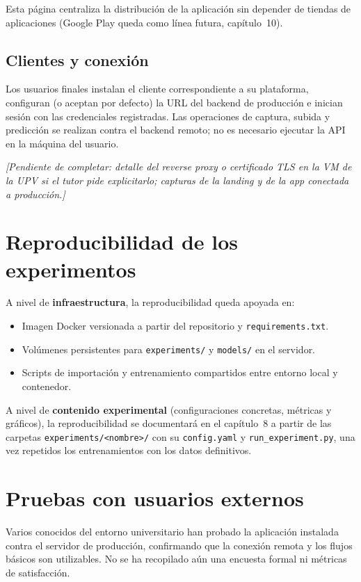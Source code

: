 \documentclass[11pt,spanish,listoffigures,listoftables]{tfgetsinf}
\begin{document}
Esta página centraliza la distribución de la aplicación sin depender de tiendas de aplicaciones (Google Play queda como línea futura, capítulo~10).

\subsection{Clientes y conexión}

Los usuarios finales instalan el cliente correspondiente a su plataforma, configuran (o aceptan por defecto) la URL del backend de producción e inician sesión con las credenciales registradas. Las operaciones de captura, subida y predicción se realizan contra el backend remoto; no es necesario ejecutar la API en la máquina del usuario.

\textit{[Pendiente de completar: detalle del reverse proxy o certificado TLS en la VM de la UPV si el tutor pide explicitarlo; capturas de la landing y de la app conectada a producción.]}

\section{Reproducibilidad de los experimentos}

A nivel de \textbf{infraestructura}, la reproducibilidad queda apoyada en:

\begin{itemize}
    \item Imagen Docker versionada a partir del repositorio y \texttt{requirements.txt}.
    \item Volúmenes persistentes para \texttt{experiments/} y \texttt{models/} en el servidor.
    \item Scripts de importación y entrenamiento compartidos entre entorno local y contenedor.
\end{itemize}

A nivel de \textbf{contenido experimental} (configuraciones concretas, métricas y gráficos), la reproducibilidad se documentará en el capítulo~8 a partir de las carpetas \texttt{experiments/<nombre>/} con su \texttt{config.yaml} y \texttt{run\_experiment.py}, una vez repetidos los entrenamientos con los datos definitivos.

\section{Pruebas con usuarios externos}

Varios conocidos del entorno universitario han probado la aplicación instalada contra el servidor de producción, confirmando que la conexión remota y los flujos básicos son utilizables. No se ha recopilado aún una encuesta formal ni métricas de satisfacción.
\end{document}
